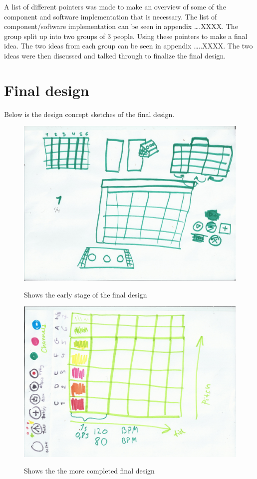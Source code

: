 \setlength{\parindent}{10ex}
A list of different pointers was made to make an overview of some of the component and software implementation that is necessary. 
The list of component/software implementation can be seen in appendix ….XXXX. 
The group split up into two groups of 3 people. Using these pointers to make a final idea. 
The two ideas from each group can be seen in appendix …..XXXX. 
The two ideas were then discussed and talked through to finalize the final design. 

\section{Final design}
Below is the design concept sketches of the final design. 

\begin{figure}[H]
	\centering
	\includegraphics[width=0.7\linewidth]{figure/Design/sketchOne}
	\label{fig:sketchOne}
	\caption{Shows the early stage of the final design}
	
\end{figure}

\begin{figure}[H]
	\centering
	\includegraphics[width=0.7\linewidth]{figure/Design/sketchTwo}
	\label{fig:sketchTwo}
	\caption{Shows the the more completed final design}
	
\end{figure}

